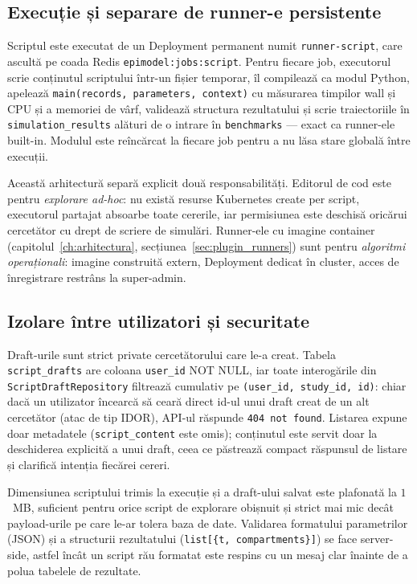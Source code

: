 \subsection{Execuție și separare de runner-e persistente}
\label{subsec:editor_executor}

Scriptul este executat de un Deployment permanent numit \texttt{runner-script},
care ascultă pe coada Redis \texttt{epimodel:jobs:script}. Pentru fiecare job,
executorul scrie conținutul scriptului într-un fișier temporar, îl compilează
ca modul Python, apelează \texttt{main(records, parameters, context)} cu
măsurarea timpilor wall și CPU și a memoriei de vârf, validează structura
rezultatului și scrie traiectoriile în \texttt{simulation\_results} alături de
o intrare în \texttt{benchmarks} --- exact ca runner-ele built-in. Modulul
este reîncărcat la fiecare job pentru a nu lăsa stare globală între execuții.

Această arhitectură separă explicit două responsabilități. Editorul de cod
este pentru \emph{explorare ad-hoc}: nu există resurse Kubernetes create per
script, executorul partajat absoarbe toate cererile, iar permisiunea este
deschisă oricărui cercetător cu drept de scriere de simulări. Runner-ele cu
imagine container (capitolul~\ref{ch:arhitectura},
secțiunea~\ref{sec:plugin_runners}) sunt pentru \emph{algoritmi
operaționali}: imagine construită extern, Deployment dedicat în cluster,
acces de înregistrare restrâns la super-admin.

\subsection{Izolare între utilizatori și securitate}
\label{subsec:editor_securitate}

Draft-urile sunt strict private cercetătorului care le-a creat. Tabela
\texttt{script\_drafts} are coloana \texttt{user\_id} NOT NULL, iar toate
interogările din \texttt{ScriptDraftRepository} filtrează cumulativ pe
\texttt{(user\_id, study\_id, id)}: chiar dacă un utilizator încearcă să ceară
direct id-ul unui draft creat de un alt cercetător (atac de tip IDOR), API-ul
răspunde \texttt{404 not found}. Listarea expune doar metadatele
(\texttt{script\_content} este omis); conținutul este servit doar la
deschiderea explicită a unui draft, ceea ce păstrează compact răspunsul de
listare și clarifică intenția fiecărei cereri.

Dimensiunea scriptului trimis la execuție și a draft-ului salvat este
plafonată la $1$~MB, suficient pentru orice script de explorare obișnuit și
strict mai mic decât payload-urile pe care le-ar tolera baza de date.
Validarea formatului parametrilor (JSON) și a structurii rezultatului
(\texttt{list[\{t, compartments\}]}) se face server-side, astfel încât un
script rău formatat este respins cu un mesaj clar înainte de a polua tabelele
de rezultate.

